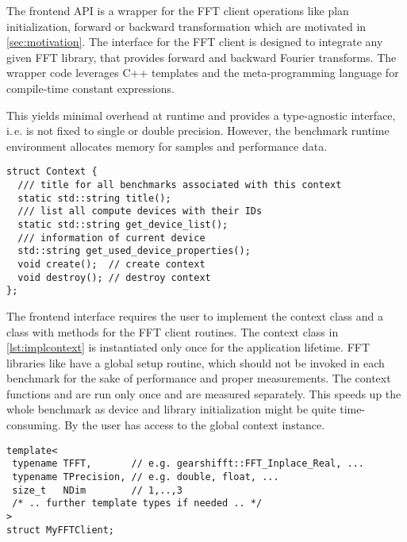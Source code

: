 The frontend API is a wrapper for the FFT client operations like plan initialization, forward or backward transformation which are motivated in \cref{sec:motivation}.
The interface for the FFT client is designed to integrate any given FFT library, that provides forward and backward Fourier transforms.
The wrapper code leverages C++ templates and the meta-programming language for compile-time constant expressions.

This yields minimal overhead at runtime and provides a type-agnostic interface, i.\,e. \gearshifft{} is not fixed to single or double precision.
However, the benchmark runtime environment allocates memory for samples and performance data.

\begin{lstlisting}[caption={Context class required by gearshifft frontend API},label={lst:implcontext}]
struct Context {
  /// title for all benchmarks associated with this context
  static std::string title();
  /// list all compute devices with their IDs
  static std::string get_device_list();
  /// information of current device
  std::string get_used_device_properties();
  void create();  // create context
  void destroy(); // destroy context
};
\end{lstlisting}

The frontend interface requires the user to implement the context class and a class with methods for the FFT client routines.
The context class in \cref{lst:implcontext} is instantiated only once for the application lifetime.
FFT libraries like \clfft{} have a global setup routine, which should not be invoked in each benchmark for the sake of performance and proper measurements. 
The context functions  and  are run only once and are measured separately.
This speeds up the whole benchmark as device and library initialization might be quite time-consuming. 
By  the user has access to the global context instance.

\begin{lstlisting}[caption={Required template arguments for FFT client implementation},label={lst:implfft_templ}]
template<
 typename TFFT,       // e.g. gearshifft::FFT_Inplace_Real, ...
 typename TPrecision, // e.g. double, float, ...
 size_t   NDim        // 1,..,3
 /* .. further template types if needed .. */
>
struct MyFFTClient;
\end{lstlisting}

